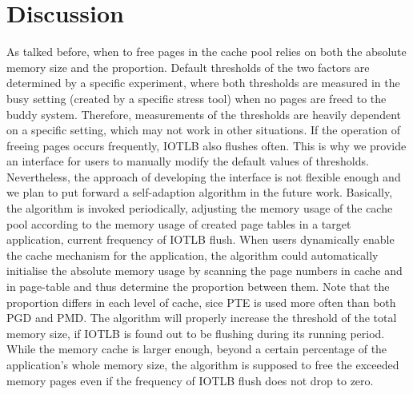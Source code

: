 \section{\name Discussion} \label{sec:dis}

As talked before, when to free pages in the cache pool relies on both the absolute memory size and the proportion. Default thresholds of the two factors are determined by a specific experiment, where both thresholds are measured in the busy setting (created by a specific stress tool) when no pages are freed to the buddy system. Therefore, measurements of the thresholds are heavily dependent on a specific setting, which may not work in other situations. If the operation of freeing pages occurs frequently, IOTLB also flushes often. This is why we provide an interface for users to manually modify the default values of thresholds. Nevertheless, the approach of developing the interface is not flexible enough and we plan to put forward a self-adaption algorithm in the future work. Basically, the algorithm is invoked periodically, adjusting the memory usage of the cache pool according to the memory usage of created page tables in a target application, current frequency of IOTLB flush. When users dynamically enable the cache mechanism for the application, the algorithm could automatically initialise the absolute memory usage by scanning the page numbers in cache and in page-table and thus determine the proportion between them. Note that the proportion differs in each level of cache, sice PTE is used more often than both PGD and PMD. The algorithm will properly increase the threshold of the total memory size, if IOTLB is found out to be flushing during its running period. While the memory cache is larger enough, beyond a certain percentage of the application's whole memory size, the algorithm is supposed to free the exceeded memory pages even if the frequency of IOTLB flush does not drop to zero.


